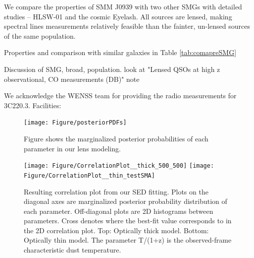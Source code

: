 \documentclass[twocolumn,apj,numberedappendix]{emulateapj}
\begin{document}
We compare the properties of SMM J0939 with two other SMGs with detailed studies -- HLSW-01 and the cosmic Eyelash. All sources are lensed, making spectral lines measurements relatively feasible than the fainter, un-lensed sources of the same population.

Properties and comparison with similar galaxies in Table \ref{tab:comapreSMG}

Discussion of SMG, broad, population.
look at "Lensed QSOs at high z observational, CO measurements (DB)" note

\acknowledgments

We acknowledge the WENSS team for providing the radio measurements for 3C220.3.
Facilities: 




\appendix

\begin{figure}[!tbp]
\centering
\texttt{[image: Figure/posteriorPDFs]}
\caption{Figure shows the marginalized posterior probabilities of each parameter in our lens modeling.
\label{fig:LensPDF}}
\end{figure}

\begin{figure}[!tbp]
\centering
\texttt{[image: Figure/CorrelationPlot\_\_thick\_500\_500]}
\texttt{[image: Figure/CorrelationPlot\_\_thin\_testSMA]}
\caption{Resulting correlation plot from our SED fitting. Plots on the diagonal axes are marginalized posterior probability 
distribution of each
parameter. Off-diagonal plots are 2D histograms between parameters. Cross denotes where the best-fit value corresponds to in 
the 2D correlation plot. Top: Optically thick
model. Bottom: Optically thin model. The parameter T/(1+z) is the observed-frame characteristic dust temperature.
\label{fig:sedlikelihood}}
\end{figure}
\end{document}
